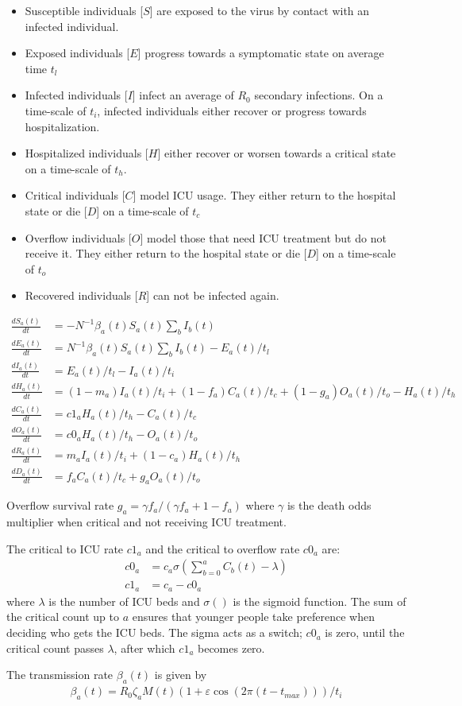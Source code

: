 \documentclass[a4paper]{article}
\begin{document}
\begin{itemize}
\item Susceptible individuals [$S$] are exposed to the virus by
  contact with an infected individual.
\item Exposed individuals [$E$] progress towards a symptomatic state
  on average time $t_l$
\item Infected individuals [$I$] infect an average of $R_0$ secondary
  infections. On a time-scale of $t_i$, infected individuals either
  recover or progress towards hospitalization.
\item Hospitalized individuals [$H$] either recover or worsen towards
  a critical state on a time-scale of $t_h$.
\item Critical individuals [$C$] model ICU usage. They either return
  to the hospital state or die [$D$] on a time-scale of $t_c$
\item Overflow individuals [$O$] model those that need ICU treatment
  but do not receive it. They either return to the hospital state or
  die [$D$] on a time-scale of $t_o$
\item Recovered individuals [$R$] can not be infected again.
\end{itemize}

\begin{align*} 
  \frac{dS_{a}(t)}{dt} & = -N^{-1}\beta_a(t) S_a(t)\sum_{b}I_b(t) \\ 
  \frac{dE_{a}(t)}{dt} & = N^{-1}\beta_a(t) S_a(t)\sum_{b}I_b(t) - E_{a}(t)/t_l \\ 
  \frac{dI_{a}(t)}{dt} & = E_{a}(t)/t_l - I_a(t)/t_i \\ 
  \frac{dH_{a}(t)}{dt} & = (1-m_a) I_a(t)/t_i + (1-f_a) C_a(t)/t_c + (1 - g_a) O_a(t)/t_o - H_a(t)/t_h \\ 
  \frac{dC_{a}(t)}{dt} & = c1_a H_a(t)/t_h - C_a(t)/t_c \\ 
  \frac{dO_{a}(t)}{dt} & = c0_a H_a(t)/t_h - O_a(t)/t_o \\ 
  \frac{dR_{a}(t)}{dt} & = m_a I_a(t)/t_i + (1-c_a)H_a(t)/t_h \\ 
  \frac{dD_{a}(t)}{dt} & = f_a C_a(t)/t_c + g_a O_a(t)/t_o
\end{align*}

Overflow survival rate $g_a = \gamma f_a/(\gamma f_a + 1 - f_a)$
where $\gamma$ is the death odds multiplier when critical and not
receiving ICU treatment.

The critical to ICU rate $c1_a$ and the critical to overflow rate $c0_a$ are:
\begin{align*}
	c0_a &= c_a\sigma\left (\sum_{b=0}^a C_b(t) - \lambda\right ) \\
	c1_a &= c_a - c0_a
\end{align*}
where $\lambda$ is the number of ICU beds and $\sigma()$ is the sigmoid function.
The sum of the critical count up to $a$ ensures that younger people take preference when deciding who gets the ICU beds.
The sigma acts as a switch; $c0_a$ is zero, until the critical count passes $\lambda$, after which $c1_a$ becomes zero.

The transmission rate $\beta_a(t)$ is given by
\begin{align*}
\beta_a(t) = R_0 \zeta_a M(t) (1+\varepsilon \cos(2\pi (t-t_{max})))/t_i
\end{align*}
\end{document}
